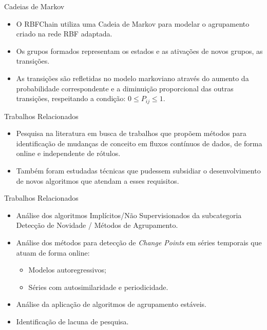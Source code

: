 \documentclass[10pt]{beamer}
\begin{document}
\begin{frame}{Cadeias de Markov}
    \begin{itemize}
        \item<1 -> O RBFChain utiliza uma Cadeia de Markov para modelar o agrupamento criado na rede RBF adaptada.
        \item<1 -> Os grupos formados representam os estados e as ativações de novos grupos, as transições.
        \item<1 -> As transições são refletidas no modelo markoviano através do aumento da probabilidade correspondente e a diminuição proporcional das outras transições, respeitando a condição: $0 \leq P_{ij} \leq 1$.
      \end{itemize}
\end{frame}

\begin{frame}{Trabalhos Relacionados}
    \begin{itemize}
        \item<1 -> Pesquisa na literatura em busca de trabalhos que propõem métodos para identificação de mudanças de conceito em fluxos contínuos de dados, de forma online e independente de rótulos.
        \item<1 -> Também foram estudadas técnicas que pudessem subsidiar o desenvolvimento de novos algoritmos que atendam a esses requisitos.
    \end{itemize}
\end{frame}

\begin{frame}{Trabalhos Relacionados}
    \begin{itemize}
        \item<1 -> Análise dos algoritmos \alert{Implícitos/Não Supervisionados} da subcategoria \alert{Detecção de Novidade / Métodos de Agrupamento}.
        \item<1 -> Análise dos métodos para detecção de \textit{Change Points} em séries temporais que atuam de forma online:
        \begin{itemize}
            \item<1 -> Modelos autoregressivos;
            \item<1 -> Séries com autosimilaridade e periodicidade.
        \end{itemize}
        \item<1 -> Análise da aplicação de algoritmos de agrupamento estáveis.
        \item<1 -> Identificação de lacuna de pesquisa.
      \end{itemize}
\end{frame}
\end{document}
